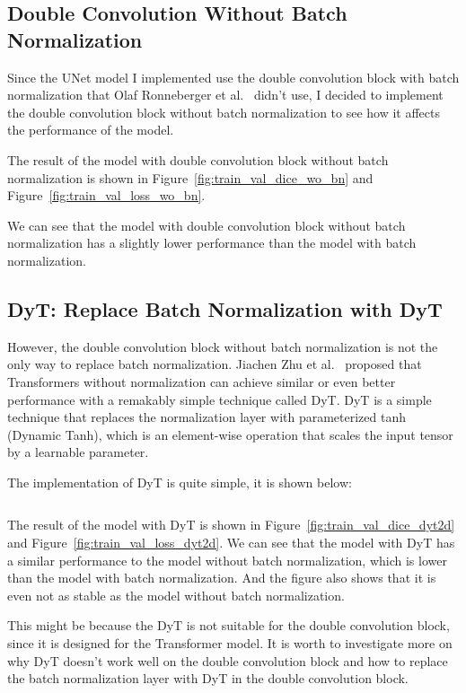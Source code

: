 \subsection{Double Convolution Without Batch Normalization}

Since the UNet model I implemented use the double convolution block with batch normalization that Olaf Ronneberger et al.~\cite{UNet} didn't use, I decided to implement the double convolution block without batch normalization to see how it affects the performance of the model.

The result of the model with double convolution block without batch normalization is shown in Figure~\ref{fig:train_val_dice_wo_bn} and Figure~\ref{fig:train_val_loss_wo_bn}.


We can see that the model with double convolution block without batch normalization has a slightly lower performance than the model with batch normalization.

\subsection{DyT: Replace Batch Normalization with DyT}
\label{sec:dyt}

However, the double convolution block without batch normalization is not the only way to replace batch normalization.
Jiachen Zhu et al.~\cite{DyT} proposed that Transformers without normalization can achieve similar or even better performance with a remakably simple technique called DyT.
DyT is a simple technique that replaces the normalization layer with parameterized tanh (Dynamic Tanh), which is an element-wise operation that scales the input tensor by a learnable parameter.

The implementation of DyT is quite simple, it is shown below:

\inputminted[firstline=5, lastline=20]{python}{../src/models/common.py}

The result of the model with DyT is shown in Figure~\ref{fig:train_val_dice_dyt2d} and Figure~\ref{fig:train_val_loss_dyt2d}.
We can see that the model with DyT has a similar performance to the model without batch normalization, which is lower than the model with batch normalization.
And the figure also shows that it is even not as stable as the model without batch normalization.

This might be because the DyT is not suitable for the double convolution block, since it is designed for the Transformer model.
It is worth to investigate more on why DyT doesn't work well on the double convolution block and how to replace the batch normalization layer with DyT in the double convolution block.


